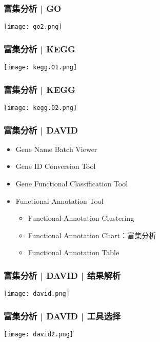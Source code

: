 \begin{frame}
  \frametitle{富集分析 | GO}
    \begin{center}
      \texttt{[image: go2.png]}
    \end{center}
\end{frame}

\begin{frame}
  \frametitle{富集分析 | KEGG}
    \begin{center}
      \texttt{[image: kegg.01.png]}
    \end{center}
\end{frame}

\begin{frame}
  \frametitle{富集分析 | KEGG}
    \begin{center}
      \texttt{[image: kegg.02.png]}
    \end{center}
\end{frame}

\begin{frame}
  \frametitle{富集分析 | DAVID}
  \begin{itemize}
    \item Gene Name Batch Viewer
    \item Gene ID Conversion Tool
    \item Gene Functional Classification Tool
    \item Functional Annotation Tool
    \begin{itemize}
      \item Functional Annotation Clustering
      \item \alert{Functional Annotation Chart}：富集分析
      \item Functional Annotation Table
    \end{itemize}
  \end{itemize}
\end{frame}

\begin{frame}
  \frametitle{富集分析 | DAVID | \alert{结果解析}}
  \begin{center}
    \texttt{[image: david.png]}
  \end{center}
\end{frame}

\begin{frame}
  \frametitle{富集分析 | DAVID | 工具选择}
  \begin{center}
    \texttt{[image: david2.png]}
  \end{center}
\end{frame}

